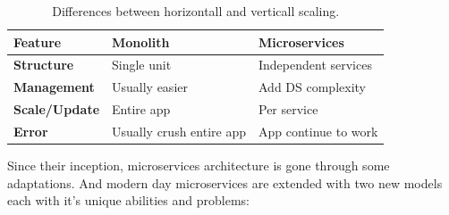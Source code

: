 \begin{table}[h!]
	\begin{center}
		\begin{tabular}{l|l|l}
			\textbf{Feature} & \textbf{Monolith} & \textbf{Microservices}\\
			\hline
			\textbf{Structure} & Single unit & Independent services \\
			\textbf{Management} & Usually easier & Add DS complexity\\
			\textbf{Scale/Update} & Entire app & Per service \\
			\textbf{Error} & Usually crush entire app & App continue to work \\
		\end{tabular}
	\end{center}
	\vspace{-0.5cm}
	\caption{Differences between horizontall and verticall scaling.}
	\label{tab:table3}
\end{table}

Since their inception, microservices architecture is gone through some adaptations. And modern day microservices are extended with two new models each with it's unique abilities and problems:

